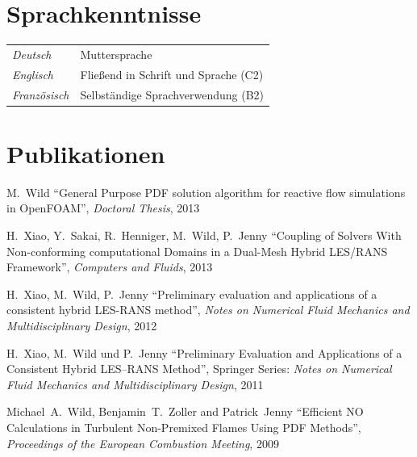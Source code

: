 \documentclass[line,11pt,a4paper]{resume}
\begin{document}
\begin{resume}
\section{\mysidestyle Sprachkenntnisse}\vspace{2mm}
\begin{tabular}{@{}ll}
  \textsl{Deutsch}     & Muttersprache \\
  \textsl{Englisch}    & Flie{\ss}end in Schrift und Sprache (C2) \\
  \textsl{Französisch} & Selbständige Sprachverwendung (B2) \\
\end{tabular}

\section{\mysidestyle Publikationen}\vspace{2mm}
M.~Wild
``General Purpose PDF solution algorithm for reactive flow simulations in
OpenFOAM'', \textsl{Doctoral Thesis}, 2013

\vspace{-3mm}
H.~Xiao, Y.~Sakai, R.~Henniger, M.~Wild, P.~Jenny
``Coupling of Solvers With Non-conforming computational Domains in a Dual-Mesh
Hybrid LES/RANS Framework'', \textsl{Computers and Fluids}, 2013

\vspace{-3mm}
H.~Xiao, M.~Wild, P.~Jenny
``Preliminary evaluation and applications of a consistent hybrid LES-RANS
method'', \textsl{Notes on Numerical Fluid Mechanics and Multidisciplinary
Design}, 2012

\vspace{-3mm}
H.~Xiao, M.~Wild und P.~Jenny ``Preliminary Evaluation and
Applications of a Consistent Hybrid LES--RANS Method'', Springer Series:
\textsl{Notes on Numerical Fluid Mechanics and Multidisciplinary Design}, 2011

\vspace{-3mm}
Michael~A.~Wild, Benjamin~T.~Zoller and Patrick~Jenny
``Efficient NO Calculations in Turbulent Non-Premixed Flames Using
PDF Methods'', \textsl{Proceedings of the European Combustion Meeting}, 2009



\end{resume}
\end{document}
